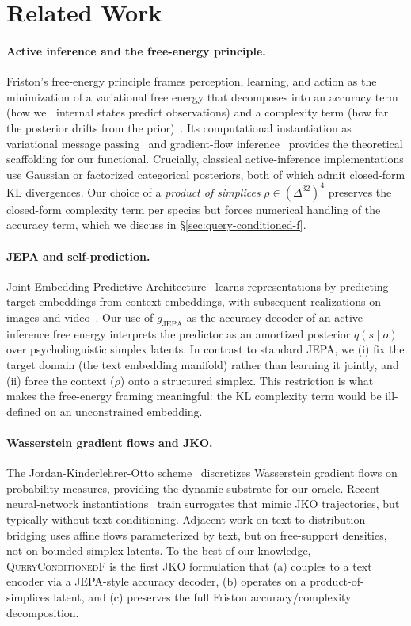 \section{Related Work}
\label{sec:related}

\paragraph{Active inference and the free-energy principle.}
Friston's free-energy principle frames perception, learning, and
action as the minimization of a variational free energy that
decomposes into an accuracy term (how well internal states predict
observations) and a complexity term (how far the posterior drifts
from the prior)~\citep{friston2010}. Its computational instantiation
as variational message passing~\citep{parr2017} and gradient-flow
inference~\citep{daCosta2020} provides the theoretical scaffolding
for our functional. Crucially, classical active-inference
implementations use Gaussian or factorized categorical posteriors,
both of which admit closed-form KL divergences. Our choice of a
\emph{product of simplices} $\rho \in (\Delta^{32})^4$ preserves the
closed-form complexity term per species but forces numerical
handling of the accuracy term, which we discuss in
\S\ref{sec:query-conditioned-f}.

\paragraph{JEPA and self-prediction.}
Joint Embedding Predictive Architecture~\citep{lecun2022} learns
representations by predicting target embeddings from context
embeddings, with subsequent realizations on images
\citep{assran2023ijepa} and video~\citep{bardes2024vjepa}. Our use of
$g_{\mathrm{JEPA}}$ as the accuracy decoder of an active-inference
free energy interprets the predictor as an amortized posterior
$q(s \mid o)$ over psycholinguistic simplex latents. In contrast to
standard JEPA, we (i) fix the target domain (the text embedding
manifold) rather than learning it jointly, and (ii) force the
context ($\rho$) onto a structured simplex. This restriction is what
makes the free-energy framing meaningful: the KL complexity term
would be ill-defined on an unconstrained embedding.

\paragraph{Wasserstein gradient flows and JKO.}
The Jordan-Kinderlehrer-Otto scheme~\citep{jko1998} discretizes
Wasserstein gradient flows on probability measures, providing the
dynamic substrate for our oracle. Recent neural-network
instantiations~\citep{bunne2022wgf} train surrogates that mimic JKO
trajectories, but typically without text conditioning. Adjacent work
on text-to-distribution bridging \citep{rezende2015variational} uses
affine flows parameterized by text, but on free-support densities,
not on bounded simplex latents. To the best of our knowledge,
\textsc{QueryConditionedF} is the first JKO formulation that
(a) couples to a text encoder via a JEPA-style accuracy decoder,
(b) operates on a product-of-simplices latent, and (c) preserves the
full Friston accuracy/complexity decomposition.

